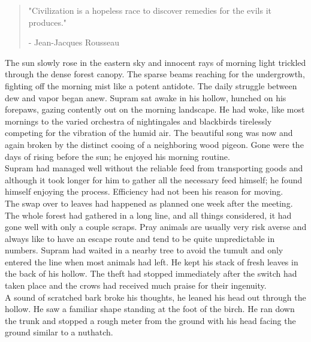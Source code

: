 \documentclass[smalldemyvopaper,11pt,twoside,onecolumn,openright,extrafontsizes]{memoir}
\begin{document}
\vspace{-1.3cm}
\begin{localsize}{10}
	\begin{quote}
		"Civilization is a hopeless race to discover remedies for the evils it produces."
		\begin{flushright}- Jean-Jacques Rousseau\end{flushright}
	\end{quote} 
\end{localsize}
\vspace{1cm}

The sun slowly rose in the eastern sky and innocent rays of morning light trickled through the dense forest canopy. The sparse beams reaching for the undergrowth, fighting off the morning mist like a potent antidote. The daily struggle between dew and vapor began anew. Supram sat awake in his hollow, hunched on his forepaws, gazing contently out on the morning landscape. He had woke, like most mornings to the varied orchestra of nightingales and blackbirds tirelessly competing for the vibration of the humid air. The beautiful song was now and again broken by the distinct cooing of a neighboring wood pigeon. Gone were the days of rising before the sun; he enjoyed his morning routine.\\

Supram had managed well without the reliable feed from transporting goods and although it took longer for him to gather all the necessary feed himself; he found himself enjoying the process. Efficiency had not been his reason for moving.\\

The swap over to leaves had happened as planned one week after the meeting. The whole forest had gathered in a long line, and all things considered, it had gone well with only a couple scraps. Pray animals are usually very risk averse and always like to have an escape route and tend to be quite unpredictable in numbers. Supram had waited in a nearby tree to avoid the tumult and only entered the line when most animals had left. He kept his stack of fresh leaves in the back of his hollow. The theft had stopped immediately after the switch had taken place and the crows had received much praise for their ingenuity.\\

A sound of scratched bark broke his thoughts, he leaned his head out through the hollow. He saw a familiar shape standing at the foot of the birch. He ran down the trunk and stopped a rough meter from the ground with his head facing the ground similar to a nuthatch.\\
\end{document}
